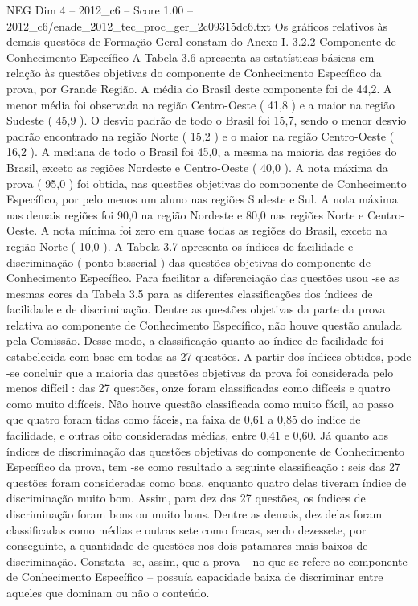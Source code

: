 \begin{textsample}{NEG Dim 4 – 2012\_c6 – Score 1.00 – 2012\_c6/enade\_2012\_tec\_proc\_ger\_2c09315dc6.txt}
Os gráficos relativos às demais questões de Formação Geral constam do Anexo I. 3.2.2 Componente de Conhecimento Específico A Tabela 3.6 apresenta as estatísticas básicas em relação às questões objetivas do componente de Conhecimento Específico da prova, por Grande Região.
A média do Brasil deste componente foi de 44,2.
A menor média foi observada na região Centro-Oeste ( 41,8 ) e a maior na região Sudeste ( 45,9 ).
O desvio padrão de todo o Brasil foi 15,7, sendo o menor desvio padrão encontrado na região Norte ( 15,2 ) e o maior na região Centro-Oeste ( 16,2 ).
A mediana de todo o Brasil foi 45,0, a mesma na maioria das regiões do Brasil, exceto as regiões Nordeste e Centro-Oeste ( 40,0 ).
A nota máxima da prova ( 95,0 ) foi obtida, nas questões objetivas do componente de Conhecimento Específico, por pelo menos um aluno nas regiões Sudeste e Sul.
A nota máxima nas demais regiões foi 90,0 na região Nordeste e 80,0 nas regiões Norte e Centro-Oeste.
A nota mínima foi zero em quase todas as regiões do Brasil, exceto na região Norte ( 10,0 ).
A Tabela 3.7 apresenta os índices de facilidade e discriminação ( ponto bisserial ) das questões objetivas do componente de Conhecimento Específico.
Para facilitar a diferenciação das questões usou -se as mesmas cores da Tabela 3.5 para as diferentes classificações dos índices de facilidade e de discriminação.
Dentre as questões objetivas da parte da prova relativa ao componente de Conhecimento Específico, não houve questão anulada pela Comissão.
Desse modo, a classificação quanto ao índice de facilidade foi estabelecida com base em todas as 27 questões.
A partir dos índices obtidos, pode -se concluir que a maioria das questões objetivas da prova foi considerada pelo menos difícil : das 27 questões, onze foram classificadas como difíceis e quatro como muito difíceis.
Não houve questão classificada como muito fácil, ao passo que quatro foram tidas como fáceis, na faixa de 0,61 a 0,85 do índice de facilidade, e outras oito consideradas médias, entre 0,41 e 0,60.
Já quanto aos índices de discriminação das questões objetivas do componente de Conhecimento Específico da prova, tem -se como resultado a seguinte classificação : seis das 27 questões foram consideradas como boas, enquanto quatro delas tiveram índice de discriminação muito bom.
Assim, para dez das 27 questões, os índices de discriminação foram bons ou muito bons.
Dentre as demais, dez delas foram classificadas como médias e outras sete como fracas, sendo dezessete, por conseguinte, a quantidade de questões nos dois patamares mais baixos de discriminação.
Constata -se, assim, que a prova – no que se refere ao componente de Conhecimento Específico – possuía capacidade baixa de discriminar entre aqueles que dominam ou não o conteúdo.

\end{textsample}
